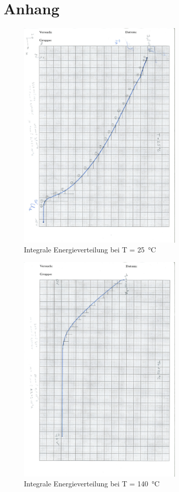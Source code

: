 \documentclass[a4,10pt]{article}
\begin{document}
\section{Anhang}\label{sec:anhang}
\begin{figure}[h!]
	\centering
	\includegraphics[angle=90,origin=c, width=0.7\textwidth]{scan/Messung1.pdf}
	\caption{Integrale Energieverteilung bei  T = \SI{25}{\celsius}}
	\label{fig:messung1}
\end{figure}
\begin{figure}[h!]
	\centering
	\includegraphics[angle=90,origin=c, width=0.7\textwidth]{scan/Messung2.pdf}
	\caption{Integrale Energieverteilung bei  T = \SI{140}{\celsius}}
	\label{fig:messung2}
\end{figure}
\end{document}
